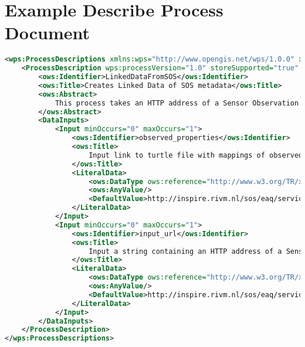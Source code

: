 \section{Example Describe Process Document}
\label{app:wpsDescribe}
\begin{lstlisting}[language=xml]
	<wps:ProcessDescriptions xmlns:wps="http://www.opengis.net/wps/1.0.0" xmlns:ows="http://www.opengis.net/ows/1.1" xmlns:xlink="http://www.w3.org/1999/xlink" xmlns:xsi="http://www.w3.org/2001/XMLSchema-instance" xsi:schemaLocation="http://www.opengis.net/wps/1.0.0 http://schemas.opengis.net/wps/1.0.0/wpsDescribeProcess_response.xsd" service="WPS" version="1.0.0" xml:lang="en-CA">
	<ProcessDescription wps:processVersion="1.0" storeSupported="true" statusSupported="false">
		<ows:Identifier>LinkedDataFromSOS</ows:Identifier>
		<ows:Title>Creates Linked Data of SOS metadata</ows:Title>
		<ows:Abstract>
			This process takes an HTTP address of a Sensor Observation Service (SOS) as input and converts the metadata to linked data.
		</ows:Abstract>
		<DataInputs>
			<Input minOccurs="0" maxOccurs="1">
				<ows:Identifier>observed_properties</ows:Identifier>
				<ows:Title>
					Input link to turtle file with mappings of observed property identifiers to DBPedia URIs
				</ows:Title>
				<LiteralData>
					<ows:DataType ows:reference="http://www.w3.org/TR/xmlschema-2/#string">string</ows:DataType>
					<ows:AnyValue/>
					<DefaultValue>http://inspire.rivm.nl/sos/eaq/service?</DefaultValue>
				</LiteralData>
			</Input>
			<Input minOccurs="0" maxOccurs="1">
				<ows:Identifier>input_url</ows:Identifier>
				<ows:Title>
					Input a string containing an HTTP address of a Sensor Observation Service (SOS). For example: 'http://someaddress.com/sos?'
				</ows:Title>
				<LiteralData>
					<ows:DataType ows:reference="http://www.w3.org/TR/xmlschema-2/#string">string</ows:DataType>
					<ows:AnyValue/>
					<DefaultValue>http://inspire.rivm.nl/sos/eaq/service?</DefaultValue>
				</LiteralData>
			</Input>
		</DataInputs>
	</ProcessDescription>
</wps:ProcessDescriptions>
\end{lstlisting}

\clearpage

